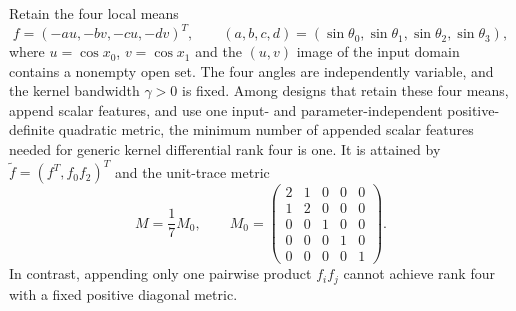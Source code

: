 \begin{proposition}
Retain the four local means
\[
 f=(-au,-bv,-cu,-dv)^T,\qquad
 (a,b,c,d)=(\sin\theta_0,\sin\theta_1,
           \sin\theta_2,\sin\theta_3),
\]
where $u=\cos x_0$, $v=\cos x_1$ and the $(u,v)$ image of the
input domain contains a nonempty open set. The four angles are
independently variable, and the kernel bandwidth $\gamma>0$ is fixed.
Among designs that retain these four means, append scalar features,
and use one input- and parameter-independent positive-definite
quadratic metric, the minimum number of appended scalar features
needed for generic kernel differential rank four is one. It is
attained by $\widetilde f=(f^T,f_0f_2)^T$ and the unit-trace metric
\[
 M=\frac{1}{7}M_0,\qquad
 M_0=\begin{pmatrix}
 2&1&0&0&0\\1&2&0&0&0\\0&0&1&0&0\\
 0&0&0&1&0\\0&0&0&0&1
 \end{pmatrix}.
\]
In contrast, appending only one pairwise product $f_if_j$ cannot
achieve rank four with a fixed positive diagonal metric.
\end{proposition}
